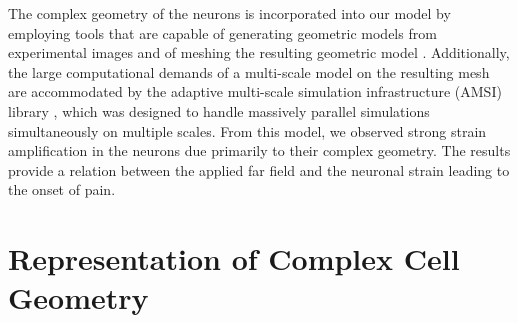 \documentclass[]{interact}
\begin{document}
The complex geometry of the neurons is incorporated into our model by employing tools \citep{simmetrix} that are capable of generating geometric models from experimental images \citep{Klaas_conference, Klaas:2013ug} and of meshing the resulting geometric model \citep{Shephard:2000vc}. Additionally, the large computational demands of a multi-scale model on the resulting mesh are accommodated by the adaptive multi-scale simulation infrastructure (AMSI) library \citep{Delalondre:2010kt,Tobin:2017ip}, which was designed to handle massively parallel simulations simultaneously on multiple scales. From this model, we observed strong strain amplification in the neurons due primarily to their complex geometry. The results provide a relation between the applied far field and the neuronal strain leading to the onset of pain.

\section{Representation of Complex Cell Geometry}
\end{document}
